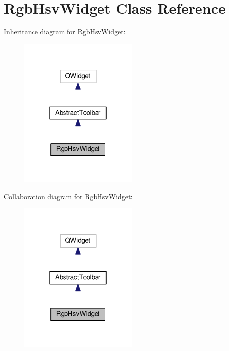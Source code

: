 \hypertarget{classRgbHsvWidget}{}\section{Rgb\+Hsv\+Widget Class Reference}
\label{classRgbHsvWidget}


Inheritance diagram for Rgb\+Hsv\+Widget\+:\nopagebreak
\begin{figure}[H]
\begin{center}
\leavevmode
\includegraphics[width=166pt]{classRgbHsvWidget__inherit__graph}
\end{center}
\end{figure}


Collaboration diagram for Rgb\+Hsv\+Widget\+:\nopagebreak
\begin{figure}[H]
\begin{center}
\leavevmode
\includegraphics[width=166pt]{classRgbHsvWidget__coll__graph}
\end{center}
\end{figure}
